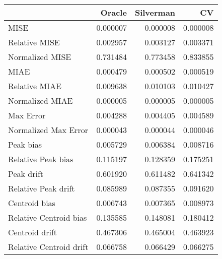 \begin{tabular}{lrrr}
  \hline
 & Oracle & Silverman & CV \\ 
  \hline
MISE & 0.000007 & 0.000008 & 0.000008 \\ 
  Relative MISE & 0.002957 & 0.003127 & 0.003371 \\ 
  Normalized MISE & 0.731484 & 0.773458 & 0.833855 \\ 
  MIAE & 0.000479 & 0.000502 & 0.000519 \\ 
  Relative MIAE & 0.009638 & 0.010103 & 0.010427 \\ 
  Normalized MIAE & 0.000005 & 0.000005 & 0.000005 \\ 
  Max Error & 0.004288 & 0.004405 & 0.004589 \\ 
  Normalized Max Error & 0.000043 & 0.000044 & 0.000046 \\ 
  Peak bias & 0.005729 & 0.006384 & 0.008716 \\ 
  Relative Peak bias & 0.115197 & 0.128359 & 0.175251 \\ 
  Peak drift & 0.601920 & 0.611482 & 0.641342 \\ 
  Relative Peak drift & 0.085989 & 0.087355 & 0.091620 \\ 
  Centroid bias & 0.006743 & 0.007365 & 0.008973 \\ 
  Relative Centroid bias & 0.135585 & 0.148081 & 0.180412 \\ 
  Centroid drift & 0.467306 & 0.465004 & 0.463923 \\ 
  Relative Centroid drift & 0.066758 & 0.066429 & 0.066275 \\ 
   \hline
\end{tabular}
